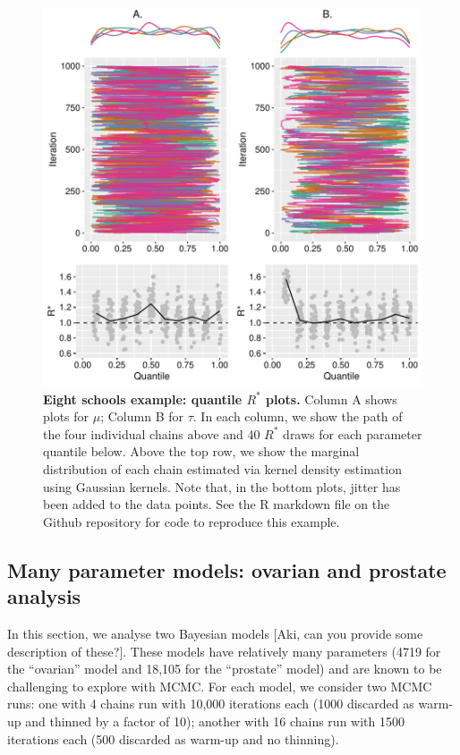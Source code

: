 \documentclass{article}
\begin{document}
\begin{figure}[!htb]
	\centerline{\includegraphics[width=1.0\textwidth]{../output/eight_schools_r_star_quantiles.pdf}}
	\caption{\textbf{Eight schools example: quantile $R^*$ plots.} Column A shows plots for $\mu$; Column B for $\tau$. In each column, we show the path of the four individual chains above and 40 $R^*$ draws for each parameter quantile below. Above the top row, we show the marginal distribution of each chain estimated via kernel density estimation using Gaussian kernels. Note that, in the bottom plots, jitter has been added to the data points. See the R markdown file on the Github repository for code to reproduce this example.}
	\label{fig:eight_schools_r_star_quantiles}
\end{figure}

\subsection{Many parameter models: ovarian and prostate analysis}
In this section, we analyse two Bayesian models [Aki, can you provide some description of these?]. These models have relatively many parameters (4719 for the ``ovarian'' model and 18,105 for the ``prostate'' model) and are known to be challenging to explore with MCMC. For each model, we consider two MCMC runs: one with 4 chains run with 10,000 iterations each (1000 discarded as warm-up and thinned by a factor of 10); another with 16 chains run with 1500 iterations each (500 discarded as warm-up and no thinning).
\end{document}
